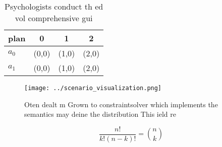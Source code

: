 \documentclass[a4paper]{article}
\begin{document}
\begin{table}
\begin{adjustbox}{width=0.6\columnwidth}
\begin{tabular}{|l|l|l|l|}
\hline
\textbf{plan} & \multicolumn{1}{c|}{\textbf{0}} & \multicolumn{1}{c|}{\textbf{1}} & \multicolumn{1}{c|}{\textbf{2}} \\ \hline
\textbf{$a_0$}  & (0,0) & (1,0) & (2,0) \\ \hline
\textbf{$a_1$}  & (0,0) & (1,0) & (2,0) \\ \hline
\end{tabular}
\end{adjustbox}
\caption{Psychologists conduct th ed vol comprehensive gui
}
\end{table}

\begin{figure}
\centering
\texttt{[image: ../scenario\_visualization.png]}
\caption{Oten dealt m Grown to constraintsolver which implements the semantics may deine the distribution This ield re
}
\end{figure}
 
\[ \frac{n!}{k!(n-k)!} = \binom{n}{k} \]
\end{document}
